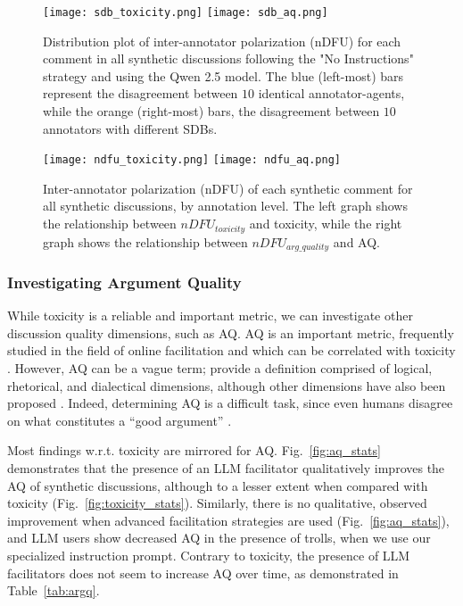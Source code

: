 \begin{figure}[t]
    \texttt{[image: sdb\_toxicity.png]} \hfill
    \texttt{[image: sdb\_aq.png]}
	\centering
	\caption{Distribution plot of inter-annotator polarization (\ac{nDFU}) for each comment in all synthetic discussions following the "No Instructions" strategy and using the Qwen 2.5 model. The blue (left-most) bars represent the disagreement between $10$ identical annotator-agents, while the orange (right-most) bars, the disagreement between $10$ annotators with different \acp{SDB}.}
    \label{fig:sdb_annot}
\end{figure}

\begin{figure}[t]
    \texttt{[image: ndfu\_toxicity.png]} \hfill
    \texttt{[image: ndfu\_aq.png]}
	\centering
	\caption{Inter-annotator polarization (\ac{nDFU}) of each synthetic comment for all synthetic discussions, by annotation level. The left graph shows the relationship between $nDFU_{toxicity}$ and toxicity, while the right graph shows the relationship between $nDFU_{arg\_quality}$ and \ac{AQ}.}
    \label{fig:ndfu_annot}
\end{figure}


\subsubsection{Investigating Argument Quality}

While toxicity is a reliable and important metric, we can investigate other discussion quality dimensions, such as \ac{AQ}. \ac{AQ} is an important metric, frequently studied in the field of online facilitation \cite{argyle2023, schroeder-etal-2024-fora, falk-etal-2024-moderation, falk-etal-2021-predicting} and which can be correlated with toxicity \cite{chang-danescu-niculescu-mizil-2019-trouble}. However, \ac{AQ} can be a vague term; \citet{wachsmuth-etal-2017-computational} provide a definition comprised of logical, rhetorical, and dialectical dimensions, although other dimensions have also been proposed \cite{habernal-gurevych-2016-argument, persing-ng-2015-modeling}. Indeed, determining \ac{AQ} is a difficult task, since even humans disagree on what constitutes a ``good argument” \cite{wachsmuth-etal-2017-computational, argyle2023}.

Most findings w.r.t. toxicity are mirrored for \ac{AQ}. Fig.~\ref{fig:aq_stats} demonstrates that the presence of an \ac{LLM} facilitator qualitatively improves the \ac{AQ} of synthetic discussions, although to a lesser extent when compared with toxicity (Fig.~\ref{fig:toxicity_stats}). Similarly, there is no qualitative, observed improvement when advanced facilitation strategies are used (Fig.~\ref{fig:aq_stats}), and \ac{LLM} users show decreased \ac{AQ} in the presence of trolls, when we use our specialized instruction prompt. Contrary to toxicity, the presence of \ac{LLM} facilitators does not seem to increase \ac{AQ} over time, as demonstrated in Table~\ref{tab:argq}.

